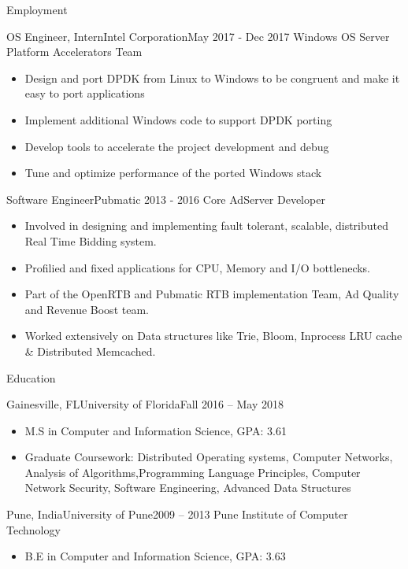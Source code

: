 \documentclass[]{mcdowellcv}
\begin{document}
	\makeheader
	
	\begin{cvsection}{Employment}
		\begin{cvsubsection}{OS Engineer, Intern}{Intel Corporation}{May 2017 - Dec 2017}
			Windows OS Server Platform Accelerators Team			
			\begin{itemize}
			\item Design and port DPDK from Linux to Windows to be congruent and make it easy to port applications
			\item Implement additional Windows code to support DPDK porting
			\item Develop tools to accelerate the project development and debug
			\item Tune and optimize performance of the ported Windows stack
		\end{itemize}
		\end{cvsubsection}
		
		\begin{cvsubsection}{Software Engineer}{Pubmatic }{2013 - 2016}	
			Core AdServer Developer
			\begin{itemize}
			\item Involved in designing and implementing fault tolerant, scalable, distributed Real Time Bidding system.
			\item Profilied and fixed applications for CPU, Memory and I/O bottlenecks.
			\item Part of the OpenRTB and Pubmatic RTB implementation Team, Ad Quality and Revenue Boost team.
			\item Worked extensively on Data structures like Trie, Bloom, Inprocess LRU cache \& Distributed Memcached.
			\end{itemize}
		\end{cvsubsection}
		
		\end{cvsection}
	
	\begin{cvsection}{Education}
		\begin{cvsubsection}{Gainesville, FL}{University of Florida}{Fall 2016 -- May 2018}
			\begin{itemize}
				\item M.S in Computer and Information Science,  GPA: 3.61
				\item  Graduate Coursework: Distributed Operating systems, Computer Networks, Analysis of Algorithms,Programming Language Principles, Computer Network
			Security, Software Engineering, Advanced Data Structures
			
		\end{itemize}
		\end{cvsubsection}
		\begin{cvsubsection}{Pune, India}{University of Pune}{2009 -- 2013}
			Pune Institute of Computer Technology	
		\begin{itemize}
				\item B.E in Computer and Information Science,  GPA: 3.63
		\end{itemize}
		\end{cvsubsection}

	\end{cvsection}
	
\end{document}
